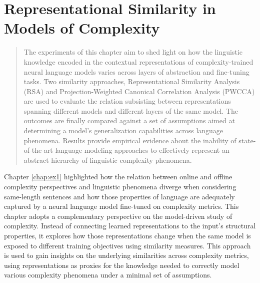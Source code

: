 \documentclass[a4paper, nobind]{templates/ociamthesis}
\begin{document}
\hypertarget{chap:ex2}{%
\chapter{\texorpdfstring{\textbf{Representational Similarity in Models of Complexity}}{Representational Similarity in Models of Complexity}}\label{chap:ex2}}

\minitoc 


\begin{quote}
The experiments of this chapter aim to shed light on how the linguistic knowledge encoded in the contextual representations of complexity-trained neural language models varies across layers of abstraction and fine-tuning tasks. Two similarity approaches, Representational Similarity Analysis (RSA) and Projection-Weighted Canonical Correlation Analysis (PWCCA) are used to evaluate the relation subsisting between representations spanning different models and different layers of the same model. The outcomes are finally compared against a set of assumptions aimed at determining a model's generalization capabilities across language phenomena. Results provide empirical evidence about the inability of state-of-the-art language modeling approaches to effectively represent an abstract hierarchy of linguistic complexity phenomena.
\end{quote}

Chapter \ref{chap:ex1} highlighted how the relation between online and offline complexity perspectives and linguistic phenomena diverge when considering same-length sentences and how those properties of language are adequately captured by a neural language model fine-tuned on complexity metrics. This chapter adopts a complementary perspective on the model-driven study of complexity. Instead of connecting learned representations to the input's structural properties, it explores how those representations change when the same model is exposed to different training objectives using similarity measures. This approach is used to gain insights on the underlying similarities across complexity metrics, using representations as proxies for the knowledge needed to correctly model various complexity phenomena under a minimal set of assumptions.
\end{document}
